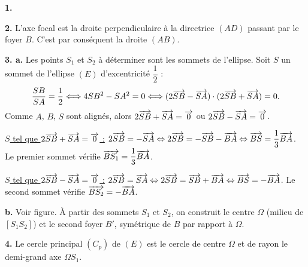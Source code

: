 \documentclass[11pt]{article}
\begin{document}

\textbf{1.} \begin{center}
\end{center}

\textbf{2.} L'axe focal est la droite perpendiculaire à la directrice $(AD)$ passant par le foyer $B$. C'est par conséquent la droite $(AB)$.

\textbf{3. a.} Les points $S_1$ et $S_2$ à déterminer sont les sommets de l'ellipse. Soit $S$ un sommet de l'ellipse $(E)$ d'excentricité $\dfrac{1}{2}$ :
\[ \frac{SB}{SA} = \frac{1}{2} \Longleftrightarrow 4SB^2 - SA^2 = 0 \Longleftrightarrow (2\overrightarrow{SB} - \overrightarrow{SA}) \cdot (2\overrightarrow{SB} + \overrightarrow{SA}) = 0. \]
Comme $A$, $B$, $S$ sont alignés, alors $2\overrightarrow{SB} + \overrightarrow{SA} = \overrightarrow{0}$ ou $2\overrightarrow{SB} - \overrightarrow{SA} = \overrightarrow{0}$.

\underline{$S$ tel que $2\overrightarrow{SB} + \overrightarrow{SA} = \overrightarrow{0}$ :} $2\overrightarrow{SB} = -\overrightarrow{SA} \Leftrightarrow 2\overrightarrow{SB} = -\overrightarrow{SB} - \overrightarrow{BA} \Leftrightarrow \overrightarrow{BS} = \dfrac{1}{3}\overrightarrow{BA}$. Le premier sommet vérifie $\overrightarrow{BS_1} = \dfrac{1}{3}\overrightarrow{BA}$.

\underline{$S$ tel que $2\overrightarrow{SB} - \overrightarrow{SA} = \overrightarrow{0}$ :} $2\overrightarrow{SB} = \overrightarrow{SA} \Leftrightarrow 2\overrightarrow{SB} = \overrightarrow{SB} + \overrightarrow{BA} \Leftrightarrow \overrightarrow{BS} = -\overrightarrow{BA}$. Le second sommet vérifie $\overrightarrow{BS_2} = -\overrightarrow{BA}$.

\textbf{b.} Voir figure. À partir des sommets $S_1$ et $S_2$, on construit le centre $\Omega$ (milieu de $[S_1 S_2]$) et le second foyer $B'$, symétrique de $B$ par rapport à $\Omega$.

\textbf{4.} Le cercle principal $(C_p)$ de $(E)$ est le cercle de centre $\Omega$ et de rayon le demi-grand axe $\Omega S_1$.
\end{document}
